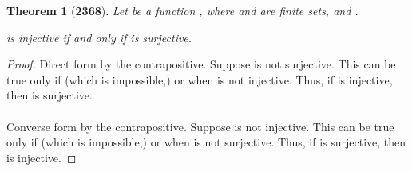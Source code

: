 \documentclass[preview]{standalone}
\newtheorem{theorem}{Theorem}
\begin{document}
\begin{theorem}[\textbf{2368}]
    Let \bm{$\lambda$} be a function 
    , 
    where  and \bm{$\mathrm{\Lambda}$} are finite sets, 
    and . 
    \begin{center}
        \bm{$\lambda$} is injective 
        if and only if 
        \bm{$\lambda$} is surjective.
    \end{center}
\end{theorem}

\begin{proof}
    Direct form by the contrapositive. 
    Suppose \bm{$\lambda$} is not surjective. 
    This can be true only if  (which is impossible,) 
    or when \bm{$\lambda$} is not injective.
    Thus, if \bm{$\lambda$} is injective, then \bm{$\lambda$} is surjective.
    \\ \\
    Converse form by the contrapositive. Suppose \bm{$\lambda$} is not injective.
    This can be true only if  (which is impossible,) 
    or when \bm{$\lambda$} is not surjective. 
    Thus, if \bm{$\lambda$} is surjective, then \bm{$\lambda$} is injective.
\end{proof}
\end{document}
